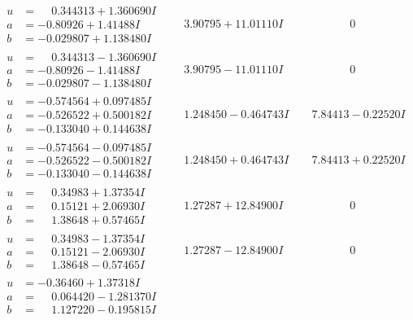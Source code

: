 \documentclass[1p]{elsarticle_modified}
\theoremstyle{definition}
\begin{document}
$$\begin{array}{c|c|c}
\begin{aligned}
u &= \phantom{-}0.344313 + 1.360690 I \\
a &= -0.80926 + 1.41488 I \\
b &= -0.029807 + 1.138480 I\end{aligned}
 & \phantom{-}3.90795 + 11.01110 I & \phantom{-0.000000 } 0 \\ \hline\begin{aligned}
u &= \phantom{-}0.344313 - 1.360690 I \\
a &= -0.80926 - 1.41488 I \\
b &= -0.029807 - 1.138480 I\end{aligned}
 & \phantom{-}3.90795 - 11.01110 I & \phantom{-0.000000 } 0 \\ \hline\begin{aligned}
u &= -0.574564 + 0.097485 I \\
a &= -0.526522 + 0.500182 I \\
b &= -0.133040 + 0.144638 I\end{aligned}
 & \phantom{-}1.248450 - 0.464743 I & \phantom{-}7.84413 - 0.22520 I \\ \hline\begin{aligned}
u &= -0.574564 - 0.097485 I \\
a &= -0.526522 - 0.500182 I \\
b &= -0.133040 - 0.144638 I\end{aligned}
 & \phantom{-}1.248450 + 0.464743 I & \phantom{-}7.84413 + 0.22520 I \\ \hline\begin{aligned}
u &= \phantom{-}0.34983 + 1.37354 I \\
a &= \phantom{-}0.15121 + 2.06930 I \\
b &= \phantom{-}1.38648 + 0.57465 I\end{aligned}
 & \phantom{-}1.27287 + 12.84900 I & \phantom{-0.000000 } 0 \\ \hline\begin{aligned}
u &= \phantom{-}0.34983 - 1.37354 I \\
a &= \phantom{-}0.15121 - 2.06930 I \\
b &= \phantom{-}1.38648 - 0.57465 I\end{aligned}
 & \phantom{-}1.27287 - 12.84900 I & \phantom{-0.000000 } 0 \\ \hline\begin{aligned}
u &= -0.36460 + 1.37318 I \\
a &= \phantom{-}0.064420 - 1.281370 I \\
b &= \phantom{-}1.127220 - 0.195815 I\end{aligned}

\end{array}$$
\end{document}
